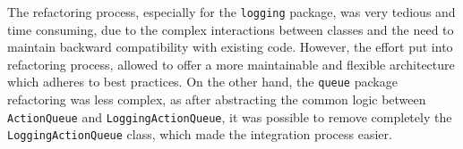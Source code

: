 The refactoring process, especially for the \texttt{logging} package, was very tedious and time consuming, due to the complex interactions between classes and the need to maintain backward compatibility with existing code. However, the effort put into refactoring process, allowed to offer a more maintainable and flexible architecture which adheres to best practices. On the other hand, the \texttt{queue} package refactoring was less complex, as after abstracting the common logic between \texttt{ActionQueue} and \texttt{LoggingActionQueue}, it was possible to remove completely the \texttt{LoggingActionQueue} class, which made the integration process easier.
